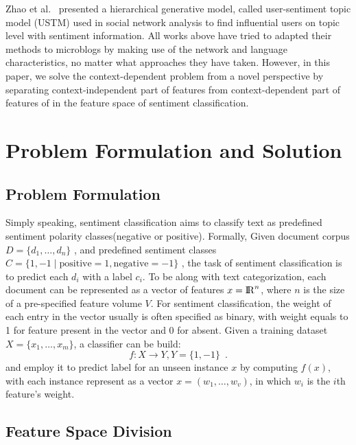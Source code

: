 \documentclass{llncs}
\begin{document}
Zhao et al.~\cite{Zhao:2012UTM} presented a hierarchical generative model, called user-sentiment topic model (USTM) used in social network analysis to find influential users on topic level with sentiment information.
All works above have tried to adapted their methods to microblogs by making use of the network and language characteristics, no matter what approaches they have taken. However, in this paper, we solve the context-dependent problem from a novel perspective by separating context-independent part of features from context-dependent part of features of in the feature space of sentiment classification.

\section{Problem Formulation and Solution}
\label{problem}

\subsection{Problem Formulation}
\label{formulation}

Simply speaking, sentiment classification aims to classify text as predefined sentiment polarity classes(negative or positive).  
Formally, Given document corpus $ D=\lbrace d_{1},\dots ,d_{n} \rbrace$ , and predefined sentiment classes $ C=\lbrace 1,-1\mid \mathrm{positive}=1,\mathrm{negative}=-1 \rbrace$ , the task of sentiment classification is to predict each $ d_{i} $ with a label $ c_{i} $. 
To be along with text categorization, each document can be represented as a vector of features $ x={\rm I\!R}^{n} $, where $ n $ is the size of a pre-specified feature volume $ V $. 
For sentiment classification, the weight of each entry in the vector usually is often specified as binary, with weight equals to 1 for feature present in the vector and 0 for absent. 
Given a training dataset $ X=\lbrace x_{1},\dots,x_{m} \rbrace $, a classifier can be build:
\begin{equation}
\label{e1}
  f:X \longrightarrow Y, Y=\lbrace 1,-1 \rbrace \enspace .
\end{equation} 
and employ it to predict label for an unseen instance $ x $ by computing $ f \left( x \right)   $, with each instance represent as a vector $ x=\left( w_{1},\dots,w_{v} \right)  $, in which $ w_{i} $ is the $ i $th feature’s weight. 

\subsection{Feature Space Division}
\label{division}
\end{document}
